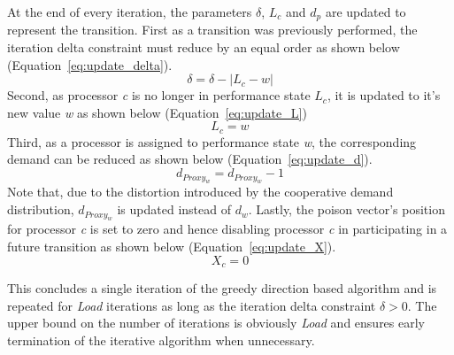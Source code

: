At the end of every iteration, the parameters $\delta$, $L_c$ and $d_p$ are updated
to represent the transition. First as a transition was previously performed, the iteration delta constraint
must reduce by an equal order as shown below (Equation~\eqref{eq:update_delta}).
\begin{equation}
    \delta = \delta - |L_{c} - w| 
\label{eq:update_delta}
\end{equation}
Second, as processor \textit{c} is no longer in performance state $L_c$, it is updated to
it's new value \textit{w} as shown below (Equation~\eqref{eq:update_L}) 
\begin{equation}
    L_{c} = w 
\label{eq:update_L}
\end{equation}
Third, as a processor is assigned to performance state \textit{w},
the corresponding demand can be reduced as shown below (Equation~\eqref{eq:update_d}).
\begin{equation}
    d_{Proxy_w} = d_{Proxy_w} - 1 
\label{eq:update_d}
\end{equation}
Note that, due to the distortion introduced by the cooperative demand distribution, $d_{Proxy_w}$ is updated
instead of $d_w$. 
Lastly, the poison vector's position for processor
\textit{c} is set to zero and hence disabling processor \textit{c} in participating in a future transition as shown
below (Equation~\eqref{eq:update_X}).
\begin{equation}
    X_c = 0
\label{eq:update_X}
\end{equation}

This concludes a single iteration of the greedy direction based algorithm and is repeated for \textit{Load} iterations
as long as the iteration delta constraint $\delta > 0$. The upper bound on the number of iterations is obviously \textit{Load} 
and ensures early termination of the iterative algorithm when unnecessary.



